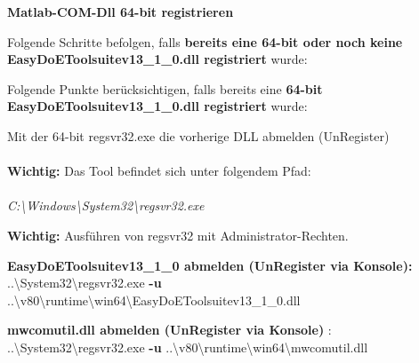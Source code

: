 \documentclass[a4paper,11pt]{article}
\begin{document}
\begin{regDll}
	\item \textbf{Matlab-COM-Dll 64-bit registrieren}
	\begin{regDll}
		\item Folgende Schritte befolgen, falls \textbf{bereits eine 64-bit oder noch keine EasyDoEToolsuitev13\_1\_0.dll registriert} wurde:
		\\
		\begin{regDll}
			\item Folgende Punkte berücksichtigen, falls bereits eine \textbf{64-bit}
			\\ \textbf{EasyDoEToolsuitev13\_1\_0.dll registriert} wurde:
			\\
			\begin{regDll}
				\item Mit der 64-bit regsvr32.exe die vorherige DLL abmelden (UnRegister)
				\\
				\\ \hspace*{5mm} \textbf{Wichtig:} Das Tool befindet sich unter folgendem Pfad:
				\\
				\\ \hspace*{10mm} \textit{C:\textbackslash{}Windows\textbackslash{}System32\textbackslash{}regsvr32.exe}
				\\
				
				\item \textbf{Wichtig:} Ausführen von regsvr32 mit Administrator-Rechten.
				\\
				
				\item \textbf{EasyDoEToolsuitev13\_1\_0 abmelden (UnRegister via Konsole):} 
				\\
			   ..\textbackslash{}System32\textbackslash{}regsvr32.exe \textbf{-u}
			   ..\textbackslash{}v80\textbackslash{}runtime\textbackslash{}win64\textbackslash{}EasyDoEToolsuitev13\_1\_0.dll
			    \\
			    
				\item  \textbf{mwcomutil.dll abmelden (UnRegister via Konsole) }:
				\\
			   ..\textbackslash{}System32\textbackslash{}regsvr32.exe \textbf{-u}
			   ..\textbackslash{}v80\textbackslash{}runtime\textbackslash{}win64\textbackslash{}mwcomutil.dll
				\\
				

\end{regDll}
\end{regDll}
\end{regDll}
\end{regDll}
\end{document}
